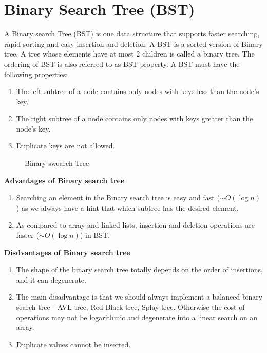 \documentclass[a4paper,11pt]{book}
\begin{document}
\section{Binary Search Tree (BST)}

A Binary search Tree (BST) is one data structure that supports faster searching, rapid sorting and easy insertion and deletion. A BST is a sorted version of Binary tree. A tree whose elements have at most 2 children is called a binary tree. The ordering of BST is also referred to as BST property. A BST must have the following properties:
\begin{enumerate}
\item The left subtree of a node contains only nodes with keys less than the node's key.
\item The right subtree of a node contains only nodes with keys greater than the node's key.
\item Duplicate keys are not allowed.
\end{enumerate}

\begin{figure}[ht]
\begin{center}
\end{center}
\caption{Binary swearch Tree}
\end{figure}
\textbf{Advantages of Binary search tree}
\begin{enumerate}
    \item Searching an element in the Binary search tree is easy and fast ($\sim O(\log n)$) as we always have a hint that which subtree has the desired element.
    \item As compared to array and linked lists, insertion and deletion operations are faster ($\sim O(\log n)$) in BST.
\end{enumerate}

\textbf{Disdvantages of Binary search tree}
\begin{enumerate}
    \item The shape of the binary search tree totally depends on the order of insertions, and it can degenerate.
    \item The main disadvantage is that we should always implement a balanced binary search tree - AVL tree, Red-Black tree, Splay tree. Otherwise the cost of operations may not be logarithmic and degenerate into a linear search on an array.
    \item Duplicate values cannot be inserted.
\end{enumerate}
\end{document}
